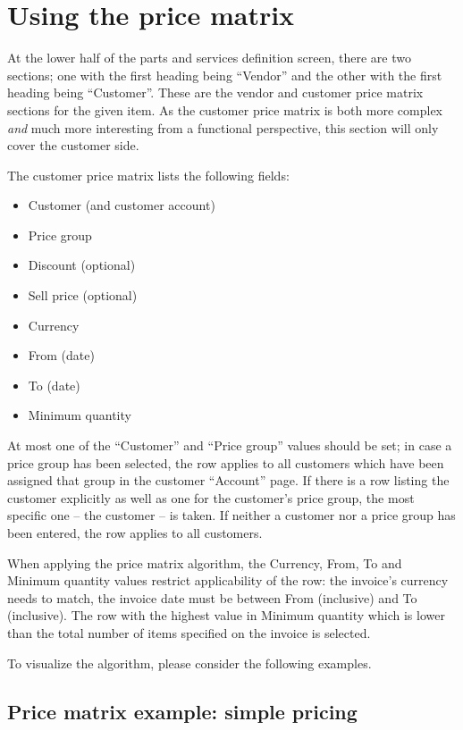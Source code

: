 \section{Using the price matrix}
\label{sec-pricing-price-matrix}

At the lower half of the parts and services definition screen, there are two sections; one with the first
heading being ``Vendor'' and the other with the first heading being ``Customer''.  These are the vendor and
customer price matrix sections for the given item. As the customer price matrix is both more complex 
\textit{and} much more interesting from a functional perspective, this section will only cover the customer
side.

The customer price matrix lists the following fields:

\begin{itemize}
	\item Customer (and customer account)
	\item Price group
	\item Discount (optional)
	\item Sell price (optional)
	\item Currency
	\item From (date)
	\item To (date)
	\item Minimum quantity
\end{itemize}

At most one of the ``Customer'' and ``Price group'' values should be set; in case a price group has been selected,
the row applies to all customers which have been assigned that group in the customer ``Account'' page. If there
is a row listing the customer explicitly as well as one for the customer's price group, the most specific one --
the customer -- is taken. If neither a customer nor a price group has been entered, the row applies to all customers.

When applying the price matrix algorithm, the Currency, From, To and Minimum quantity values restrict applicability
of the row: the invoice's currency needs to match, the invoice date must be between From (inclusive) and To (inclusive).
The row with the highest value in Minimum quantity which is lower than the total number of items specified on the invoice
is selected.

To visualize the algorithm, please consider the following examples.

\subsection{Price matrix example: simple pricing}

